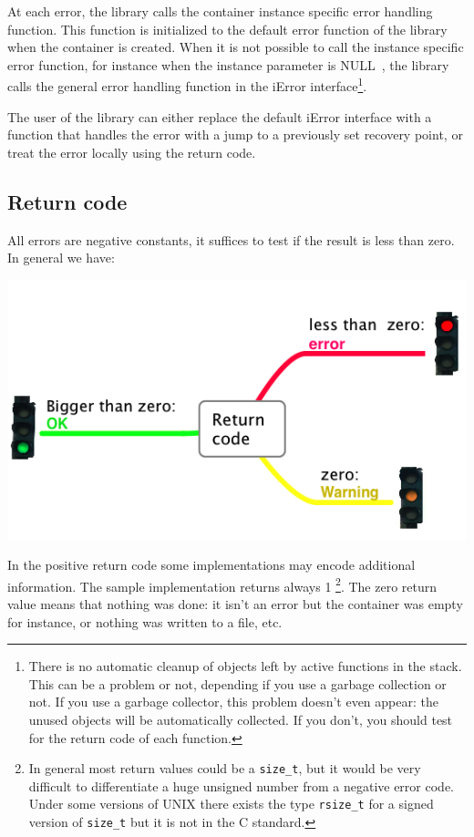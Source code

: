 \documentclass[12pt,a4paper]{memoir} %
\newif\iftth
\newcommand{\Null}{{\iftth \ NULL \else \footnotesize NULL\  \fi}}
\begin{document}
At each error, the library calls the container instance specific error handling function. This function is initialized to the default error
function of the library when the container is created. When it is not possible to call the instance specific error function, for instance when the 
instance parameter is \Null, the library calls the general error handling function in the iError interface\footnote{There is no automatic cleanup of objects left by active functions in the stack. This can be a problem or not, depending if you use a garbage collection or not. If you use a garbage collector, this problem doesn't even appear: the unused objects will be automatically collected. If you don't, you should test for the return code of each function.}.

The user of the library can either replace the default iError interface with a function that handles the error with a jump to a previously set recovery point, or treat the error locally using the return code. 
\subsection{Return code}
All errors are negative constants, it suffices to test if the result is less than zero. In general we have:
\begin{center}
\includegraphics[scale=0.63]{feux.png}
\end{center}
In the positive return code some implementations may encode additional information. The sample implementation returns always 1
\footnote{In general most return values could be a \verb+size_t+, but it would be very difficult to differentiate a huge unsigned number from a 
negative error code. Under some versions of UNIX there exists the type \verb+rsize_t+ for a signed version of \verb+size_t+ but it is not in the C 
standard.}. The zero return value means that nothing was done: it isn't an error but the container was empty for instance, or nothing was written to a 
file, etc. 
\end{document}
